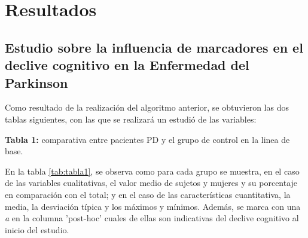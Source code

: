 \chapter{Resultados}


\section{Estudio sobre la influencia de marcadores en el declive cognitivo en la Enfermedad del Parkinson}

Como resultado de la realización del algoritmo anterior, se obtuvieron las dos tablas siguientes, con las que se realizará un estudió de las variables:

\begin{description}
	\item{\textbf{Tabla 1:}} comparativa entre pacientes PD y el grupo de control en la linea de base.
	
	En la tabla \ref{tab:tabla1}, se observa como para cada grupo se muestra, en el caso de las variables cualitativas, el valor medio de sujetos y mujeres y su porcentaje en comparación con el total; y en el caso de las características cuantitativa, la media, la desviación típica y los máximos y mínimos. Además, se marca con una \textit{a} en la columna 'post-hoc' cuales de ellas son indicativas del declive cognitivo al inicio del estudio.
	

\end{description}
